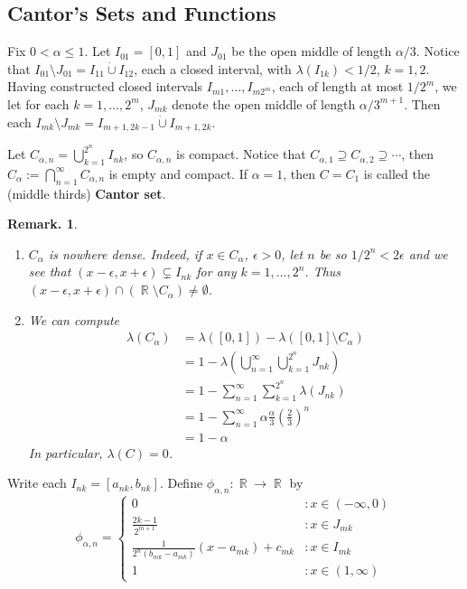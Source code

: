 \documentclass[11pt, a4paper]{memoir}
\DeclareMathOperator{\R}{{\mathbb{R}}}
\theoremstyle{change}
\theoremstyle{plain}
\theoremstyle{nonumberplain}
\newtheorem{remark}{Remark.}
\numberwithin{equation}{section}
\begin{document}
\subsection{Cantor's Sets and Functions}
Fix $0<\alpha\leq 1$.
Let $I_{01}=[0,1]$ and $J_{01}$ be the open middle of length $\alpha/3$.
Notice that $I_{01}\setminus J_{01}=I_{11}\dot{\cup}I_{12}$, each a closed interval, with $\lambda(I_{1k})<1/2$, $k=1,2$.
Having constructed closed intervals $I_{m1},\ldots,I_{m2^m}$, each of length at most $1/2^m$, we let for each $k=1,\ldots,2^m$, $J_{mk}$ denote the open middle of length $\alpha/3^{m+1}$.
Then each $I_{mk}\setminus J_{mk}=I_{m+1,2k-1}\dot{\cup}I_{m+1,2k}$.

Let $C_{\alpha,n}=\bigcup_{k=1}^{2^n}I_{nk}$, so $C_{\alpha,n}$ is compact.
Notice that $C_{\alpha,1}\supseteq C_{\alpha,2}\supseteq\cdots$, then $C_\alpha:=\bigcap_{n=1}^\infty C_{\alpha,n}$ is empty and compact.
If $\alpha=1$, then $C=C_1$ is called the (middle thirds) \textbf{Cantor set}.
\begin{remark}
    \begin{enumerate}
        \item $C_\alpha$ is nowhere dense.
            Indeed, if $x\in C_\alpha$, $\epsilon>0$, let $n$ be so $1/2^n<2\epsilon$ and we see that $(x-\epsilon,x+\epsilon)\subsetneq I_{nk}$ for any $k=1,\ldots,2^n$.
            Thus $(x-\epsilon,x+\epsilon)\cap(\R\setminus C_\alpha)\neq\emptyset$.
        \item We can compute
            \begin{align*}
                \lambda(C_\alpha)&=\lambda([0,1])-\lambda([0,1]\setminus C_\alpha)\\
                                 &= 1-\lambda\left(\bigcup_{n=1}^\infty\bigcup_{k=1}^{2^n}J_{nk}\right)\\
                                 &= 1-\sum\limits_{n=1}^\infty\sum\limits_{k=1}^{2^n}\lambda(J_{nk})\\
                                 &= 1-\sum\limits_{n=1}^\infty \alpha\frac{\alpha}{3}\left(\frac{2}{3}\right)^n\\
                                 &= 1-\alpha
            \end{align*}
            In particular, $\lambda(C)=0$.
    \end{enumerate}
\end{remark}
Write each $I_{nk}=[a_{nk},b_{nk}]$.
Define $\phi_{\alpha,n}:\R\to\R$ by
\begin{equation*}
    \phi_{\alpha,n}=\begin{cases}
        0 &: x\in(-\infty,0)\\
        \frac{2k-1}{2^{m+1}} &: x\in J_{mk}\\
        \frac{1}{2^n(b_{mk}-a_{mk})}(x-a_{mk})+c_{mk} &: x\in I_{mk}\\
        1 &: x\in(1,\infty)
    \end{cases}
\end{equation*}
\end{document}

